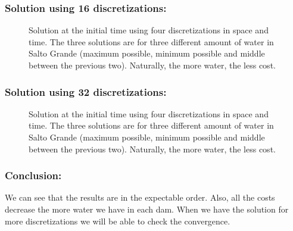 \documentclass[aspectratio=169]{beamer}\usepackage[utf8]{inputenc}
\begin{document}
\begin{frame}\frametitle{Solution using 16 discretizations:}
\begin{figure}[ht!]
\centering
{}
\caption{Solution at the initial time using four discretizations in space and time. The three solutions are for three different amount of water in Salto Grande (maximum possible, minimum possible and middle between the previous two). Naturally, the more water, the less cost.}
\end{figure}
\end{frame}

\begin{frame}\frametitle{Solution using 32 discretizations:}
\begin{figure}[ht!]
\centering
{}
\caption{Solution at the initial time using four discretizations in space and time. The three solutions are for three different amount of water in Salto Grande (maximum possible, minimum possible and middle between the previous two). Naturally, the more water, the less cost.}
\end{figure}
\end{frame}

\begin{frame}\frametitle{Conclusion:}
We can see that the results are in the expectable order. Also, all the costs decrease the more water we have in each dam. When we have the solution for more discretizations we will be able to check the convergence.
\end{frame}
\end{document}

